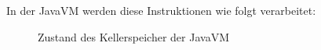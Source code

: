 \pagebreak
In der JavaVM werden diese Instruktionen wie folgt verarbeitet:
\begin{figure}[htb]
\caption{Zustand des Kellerspeicher der JavaVM}
\begin{center}
\label{fig:method}
\quad
{}
\end{center}
\end{figure}
